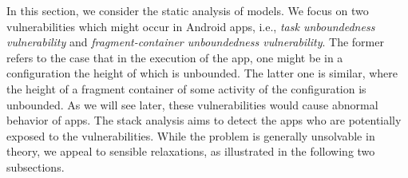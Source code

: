 

 

In this section, we consider the static analysis of {\AMASS} models.  
%
We focus on two vulnerabilities which might occur in Android apps, i.e., \emph{task unboundedness vulnerability} and \emph{fragment-container unboundedness vulnerability}.  
The former refers to the case that in the execution of the app, one might be in a configuration the height of which is unbounded. The latter one is similar, where the height of a fragment container of some activity of the configuration is unbounded. As we will see later, these vulnerabilities would cause abnormal behavior of apps. 
%
The stack analysis aims to detect the apps who are potentially exposed to the vulnerabilities. While the problem is generally unsolvable in theory, we appeal to sensible relaxations, as illustrated in the following two subsections. 




